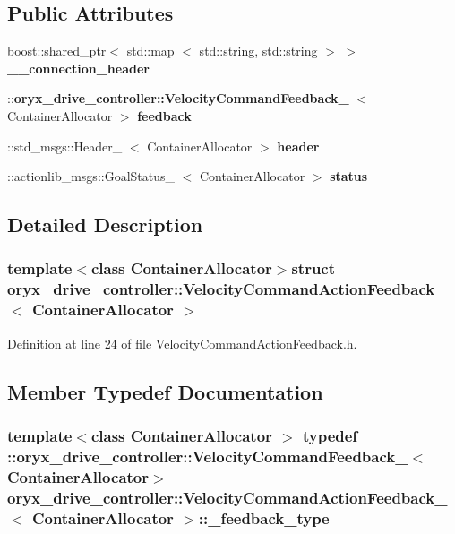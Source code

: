 \subsection*{\-Public \-Attributes}
\begin{DoxyCompactItemize}
\item 
boost\-::shared\-\_\-ptr$<$ std\-::map\*
$<$ std\-::string, std\-::string $>$ $>$ {\bf \-\_\-\-\_\-connection\-\_\-header}
\item 
\-::{\bf oryx\-\_\-drive\-\_\-controller\-::\-Velocity\-Command\-Feedback\-\_\-}\*
$<$ \-Container\-Allocator $>$ {\bf feedback}
\item 
\-::std\-\_\-msgs\-::\-Header\-\_\-\*
$<$ \-Container\-Allocator $>$ {\bf header}
\item 
\-::actionlib\-\_\-msgs\-::\-Goal\-Status\-\_\-\*
$<$ \-Container\-Allocator $>$ {\bf status}
\end{DoxyCompactItemize}


\subsection{\-Detailed \-Description}
\subsubsection*{template$<$class Container\-Allocator$>$struct oryx\-\_\-drive\-\_\-controller\-::\-Velocity\-Command\-Action\-Feedback\-\_\-$<$ Container\-Allocator $>$}



\-Definition at line 24 of file \-Velocity\-Command\-Action\-Feedback.\-h.



\subsection{\-Member \-Typedef \-Documentation}
\subsubsection[{\-\_\-feedback\-\_\-type}]{\setlength{\rightskip}{0pt plus 5cm}template$<$class Container\-Allocator $>$ typedef \-::{\bf oryx\-\_\-drive\-\_\-controller\-::\-Velocity\-Command\-Feedback\-\_\-}$<$\-Container\-Allocator$>$ {\bf oryx\-\_\-drive\-\_\-controller\-::\-Velocity\-Command\-Action\-Feedback\-\_\-}$<$ \-Container\-Allocator $>$\-::{\bf \-\_\-feedback\-\_\-type}}\label{structoryx__drive__controller_1_1VelocityCommandActionFeedback___a84623ab03d77c7699190234b5ef0449b}


